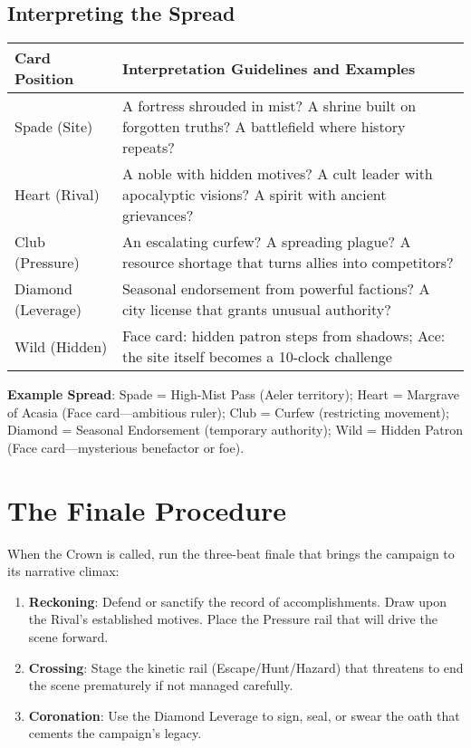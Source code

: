 \subsection*{Interpreting the Spread}

\begin{fatebox}
\begin{tabularx}{\textwidth}{lX}
\toprule
\textbf{Card Position} & \textbf{Interpretation Guidelines and Examples} \\
\midrule
Spade (Site) & A fortress shrouded in mist? A shrine built on forgotten truths? A battlefield where history repeats? \\
Heart (Rival) & A noble with hidden motives? A cult leader with apocalyptic visions? A spirit with ancient grievances? \\
Club (Pressure) & An escalating curfew? A spreading plague? A resource shortage that turns allies into competitors? \\
Diamond (Leverage) & Seasonal endorsement from powerful factions? A city license that grants unusual authority? \\
Wild (Hidden) & Face card: hidden patron steps from shadows; Ace: the site itself becomes a 10-clock challenge \\
\bottomrule
\end{tabularx}
\end{fatebox}

\textbf{Example Spread}: Spade = High-Mist Pass (Aeler territory); Heart = Margrave of Acasia (Face card—ambitious ruler); Club = Curfew (restricting movement); Diamond = Seasonal Endorsement (temporary authority); Wild = Hidden Patron (Face card—mysterious benefactor or foe).

\section*{The Finale Procedure}

When the Crown is called, run the three-beat finale that brings the campaign to its narrative climax:

\begin{enumerate}
    \item \textbf{Reckoning}: Defend or sanctify the record of accomplishments. Draw upon the Rival's established motives. Place the Pressure rail that will drive the scene forward.
    \item \textbf{Crossing}: Stage the kinetic rail (Escape/Hunt/Hazard) that threatens to end the scene prematurely if not managed carefully.
    \item \textbf{Coronation}: Use the Diamond Leverage to sign, seal, or swear the oath that cements the campaign's legacy.
\end{enumerate}

